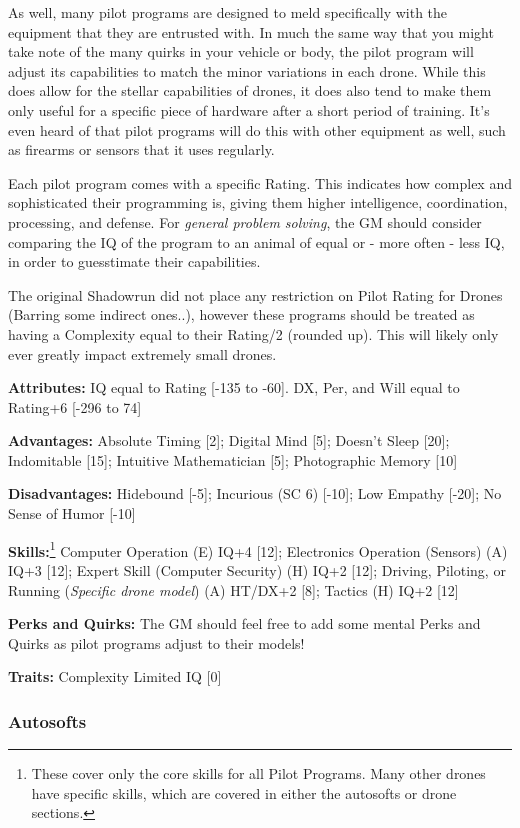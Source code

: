 As well, many pilot programs are designed to meld specifically with the equipment that they are entrusted with. In much the same way that you might take note of the many quirks in your vehicle or body, the pilot program will adjust its capabilities to match the minor variations in each drone. While this does allow for the stellar capabilities of drones, it does also tend to make them only useful for a specific piece of hardware after a short period of training. It's even heard of that pilot programs will do this with other equipment as well, such as firearms or sensors that it uses regularly.

Each pilot program comes with a specific Rating. This indicates how complex and sophisticated their programming is, giving them higher intelligence, coordination, processing, and defense. For \textit{general problem solving}, the GM should consider comparing the IQ of the program to an animal of equal or - more often - less IQ, in order to guesstimate their capabilities.

The original Shadowrun did not place any restriction on Pilot Rating for Drones (Barring some indirect ones..), however these programs should be treated as having a Complexity equal to their Rating/2 (rounded up). This will likely only ever greatly impact extremely small drones.

\textbf{Attributes:} 
IQ equal to Rating [-135 to -60]. DX, Per, and Will equal to Rating+6 [-296 to 74]

\textbf{Advantages:} 
Absolute Timing [2]; Digital Mind [5]; Doesn't Sleep [20]; Indomitable [15]; Intuitive Mathematician [5]; Photographic Memory [10]

\textbf{Disadvantages:} 
Hidebound [-5]; Incurious (SC 6) [-10]; Low Empathy [-20]; No Sense of Humor [-10]

\textbf{Skills:}\footnote{These cover only the core skills for all Pilot Programs. Many other drones have specific skills, which are covered in either the autosofts or drone sections.}
Computer Operation (E) IQ+4 [12]; Electronics Operation (Sensors) (A) IQ+3 [12]; Expert Skill (Computer Security) (H) IQ+2 [12]; Driving, Piloting, or Running (\textit{Specific drone model}) (A) HT/DX+2 [8]; Tactics (H) IQ+2 [12]

\textbf{Perks and Quirks:}
The GM should feel free to add some mental Perks and Quirks as pilot programs adjust to their models!

\textbf{Traits:}
Complexity Limited IQ [0]

\subsubsection{Autosofts}

